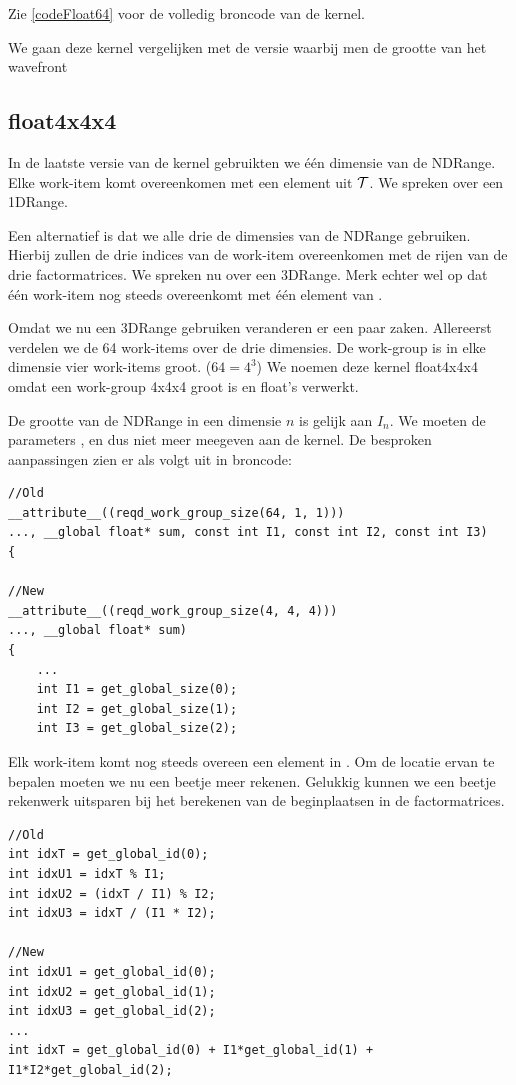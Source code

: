 
Zie \ref{codeFloat64} voor de volledig broncode van de kernel.

We gaan deze kernel vergelijken met de versie waarbij men de grootte van het wavefront 

\subsection{float4x4x4}
In de laatste versie van de kernel gebruikten we \'e\'en dimensie van de NDRange. Elke work-item komt overeenkomen met een element uit $\mathcal{T}$. We spreken over een 1DRange.

Een alternatief is dat we alle drie de dimensies van de NDRange gebruiken. Hierbij zullen de drie indices van de work-item overeenkomen met de rijen van de drie factormatrices. We spreken nu over een 3DRange. Merk echter wel op dat \'e\'en work-item nog steeds overeenkomt met \'e\'en element van \TT.

Omdat we nu een 3DRange gebruiken veranderen er een paar zaken. Allereerst verdelen we de 64 work-items over de drie dimensies. De work-group is in elke dimensie vier work-items groot. ($64 = 4^3$) We noemen deze kernel float4x4x4 omdat een work-group 4x4x4 groot is en float's verwerkt.

De grootte van de NDRange in een dimensie $n$ is gelijk aan $I_n$. We moeten de parameters ,  en  dus niet meer meegeven aan de kernel. De besproken aanpassingen zien er als volgt uit in broncode:
\begin{lstlisting}
//Old
__attribute__((reqd_work_group_size(64, 1, 1)))
..., __global float* sum, const int I1, const int I2, const int I3)
{

//New
__attribute__((reqd_work_group_size(4, 4, 4)))
..., __global float* sum)
{
	...
	int I1 = get_global_size(0);
	int I2 = get_global_size(1);
	int I3 = get_global_size(2);
\end{lstlisting}

Elk work-item komt nog steeds overeen een element in \TT{}. Om de locatie ervan te bepalen moeten we nu een beetje meer rekenen. Gelukkig kunnen we een beetje rekenwerk uitsparen bij het berekenen van de beginplaatsen in de factormatrices.
\begin{lstlisting}
//Old
int idxT = get_global_id(0);
int idxU1 = idxT % I1;
int idxU2 = (idxT / I1) % I2;
int idxU3 = idxT / (I1 * I2);

//New
int idxU1 = get_global_id(0);
int idxU2 = get_global_id(1);
int idxU3 = get_global_id(2);
...
int idxT = get_global_id(0) + I1*get_global_id(1) + I1*I2*get_global_id(2);
\end{lstlisting}

